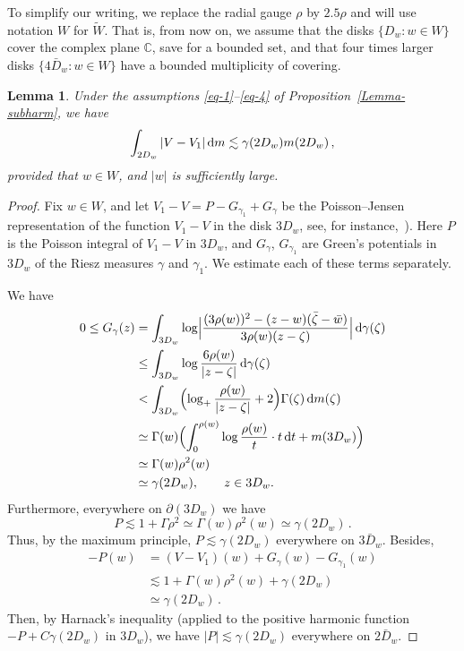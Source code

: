\documentclass[11pt]{amsart}
\numberwithin{equation}{section}
\newtheorem{lemma}{Lemma}[section]
\newcommand{\bC}{\mathbb C}
\begin{document}
To simplify our writing, we replace the radial gauge $\rho$ by $2.5\rho$ and will
use notation $W$ for $\widetilde W$. That is, from now on, we assume that the disks
$\{D_w\colon w\in W\}$ cover the complex plane $\bC$, save for a bounded set,
and that four times larger disks $\{4\bar D_w\colon w\in W\}$ have a bounded multiplicity of
covering.

\begin{lemma}{\label{LemmaC}}
Under the assumptions \eqref{eq-1}--\eqref{eq-4} of Proposition~\ref{Lemma-subharm}, we have
\[
\int_{2D_w} |V-V_1|\, {\rm d}m \lesssim \gamma(2D_w) m(2D_w)\,,
\]
provided that $w\in W$, and $|w|$ is sufficiently large.
\end{lemma}

\begin{proof}
Fix $w\in W$, and let
$ V_1-V = P - G_{\gamma_1} + G_\gamma $
be the Poisson--Jensen representation of the function $V_1-V$ in the disk $3D_w$, 
see, for instance,~\cite[Theorem~3.14]{HK}).
Here $P$ is the Poisson integral of $V_1-V$ in $3D_w$, and $G_\gamma$, $G_{\gamma_1}$
are Green's potentials in $3D_w$ of the Riesz measures $\gamma$ and $\gamma_1$.
We estimate each of these terms separately.

We have
\begin{align*}
0 \le G_\gamma (z)
&= \int_{3D_w} \log\Bigl|
\frac{(3\rho(w))^2 - (z-w)(\bar\zeta-\bar w)}{3\rho(w)(z-\zeta)} \Bigr|\, {\rm d}\gamma(\zeta) \\
&\le \int_{3D_w} \log
\frac{6\rho(w)}{|z-\zeta|}\, {\rm d}\gamma(\zeta) \\
&< \int_{3D_w} \Bigl( \log_+ \frac{\rho(w)}{|z-\zeta|} + 2 \Bigr) \Gamma(\zeta)\, {\rm d}m(\zeta) \\
&\simeq
\Gamma(w) \Bigl( \int_0^{\rho(w)} \log\frac{\rho(w)}t \cdot t\,{\rm d}t + m(3D_w) \Bigr) \\
&\simeq \Gamma(w) \rho^2(w) \\
&\simeq \gamma(2D_w),\qquad z\in 3D_w.
\end{align*}
Furthermore, everywhere on $\partial(3D_w)$ we have
\[
P \lesssim 1 + \Gamma\rho^2 \simeq \Gamma (w)\rho^2(w) \simeq \gamma (2D_w)\,.
\]
Thus, by the maximum principle,
$ P \lesssim \gamma (2D_w) $ everywhere on $3\bar D_w$. 
Besides,
\begin{align*}
-P(w) &= (V-V_1)(w) + G_\gamma (w) - G_{\gamma_1}(w) \\
&\lesssim 1 + \Gamma (w)\rho^2(w) + \gamma (2D_w) \\
&\simeq \gamma(2D_w)\,.
\end{align*}
Then, by Harnack's inequality (applied to the positive harmonic function $-P + C\gamma (2D_w)$ in $3D_w$), we have $|P|\lesssim \gamma (2D_w)$ everywhere on $2\bar D_w$.


\end{proof}
\end{document}
